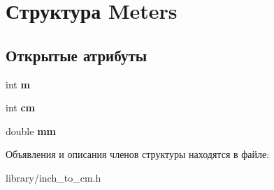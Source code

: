 \hypertarget{structMeters}{}\section{Структура Meters}
\label{structMeters}
\subsection*{Открытые атрибуты}
\begin{DoxyCompactItemize}
\item 
\hypertarget{structMeters_ace8d2f1d6952624f52a3bee426aa77a3}{}int {\bfseries m}\label{structMeters_ace8d2f1d6952624f52a3bee426aa77a3}

\item 
\hypertarget{structMeters_a0494f45e801fe40833ceec41a74d1311}{}int {\bfseries cm}\label{structMeters_a0494f45e801fe40833ceec41a74d1311}

\item 
\hypertarget{structMeters_a5f2431e14a292e4465671b9d4c6f676d}{}double {\bfseries mm}\label{structMeters_a5f2431e14a292e4465671b9d4c6f676d}

\end{DoxyCompactItemize}


Объявления и описания членов структуры находятся в файле\+:\begin{DoxyCompactItemize}
\item 
library/inch\+\_\+to\+\_\+cm.\+h\end{DoxyCompactItemize}
